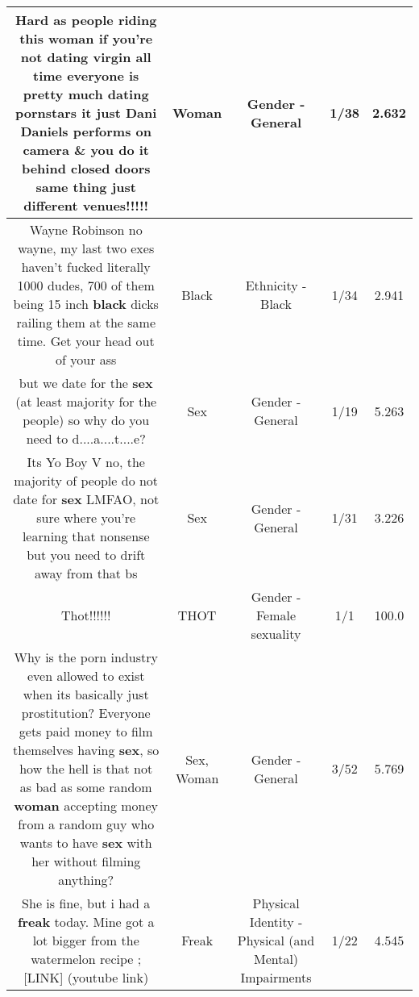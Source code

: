 \documentclass[11pt]{article}
\newlength\mylength
\begin{document}
\begin{center}
\begin{longtable}{|C{.65\mylength}|C{.30\mylength}|C{.12\mylength}|C{.12\mylength}|C{.12\mylength}|}
  \small Hard as people riding this \textbf{woman} if you're not dating virgin all time everyone is pretty much dating pornstars it just Dani Daniels performs on camera \& you do it behind closed doors same thing just different venues!!!!!\normalsize   & Woman & Gender - General & 1/38 & 2.632 \\  \hline
  \small Wayne Robinson no wayne, my last two exes haven't fucked literally 1000 dudes, 700 of them being 15 inch \textbf{black} dicks railing them at the same time. Get your head out of your ass\normalsize   & Black & Ethnicity - Black & 1/34 & 2.941 \\  \hline
  \small but we date for the \textbf{sex} (at least majority for the people) so why do you need to d....a....t....e?\normalsize   & Sex & Gender - General & 1/19 & 5.263 \\  \hline
  \small Its Yo Boy V no, the majority of people do not date for \textbf{sex} LMFAO, not sure where you're learning that nonsense but you need to drift away from that bs\normalsize   & Sex & Gender - General & 1/31 & 3.226 \\  \hline
  \small Thot!!!!!!\normalsize   & THOT & Gender - Female sexuality & 1/1 & 100.0 \\  \hline
  \small Why is the porn industry even allowed to exist when its basically just prostitution?  Everyone gets paid money to film themselves having \textbf{sex}, so how the hell is that not as bad as some random \textbf{woman} accepting money from a random guy who wants to have \textbf{sex} with her without filming anything?\normalsize   & Sex, Woman & Gender - General & 3/52 & 5.769 \\  \hline
  \small She is fine, but i had a \textbf{freak} today. Mine got a lot bigger from the watermelon recipe ;   [LINK]   (youtube link)\normalsize   & Freak & Physical Identity - Physical (and Mental) Impairments & 1/22 & 4.545 \\  \hline

\end{longtable}
\end{center}
\end{document}
